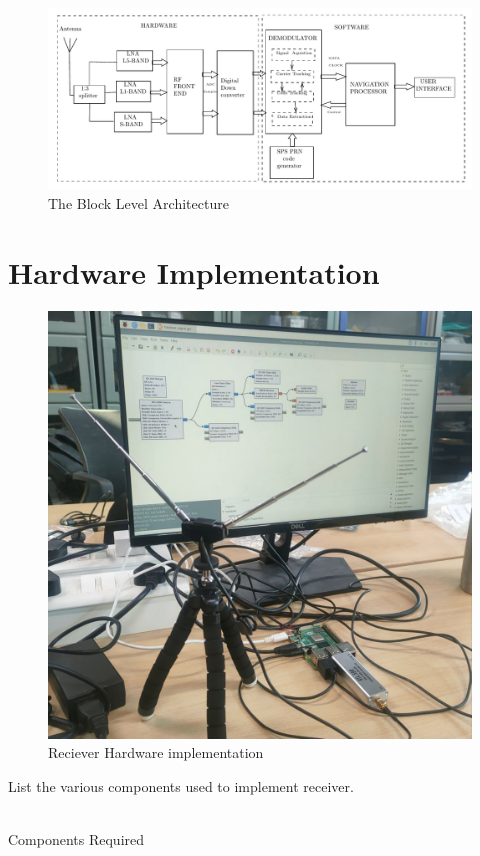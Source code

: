 \begin{figure}
\includegraphics[scale=0.5]{figs/block1}
\caption{The Block Level Architecture}
\label{fig:Block-diagram}
\end{figure}
\section{Hardware Implementation}
\begin{figure}
\includegraphics[scale=0.2]{figs/hardwareimplement.jpg} 
\caption{Reciever Hardware implementation}
\label{fig:hardware}
\end{figure}
List the various components used to implement receiver.
\\
\solution
\\
\begin{table}[!ht]
  \centering
 
  \caption{Components Required}
  \label{tab:rxcomponents}
\end{table}
